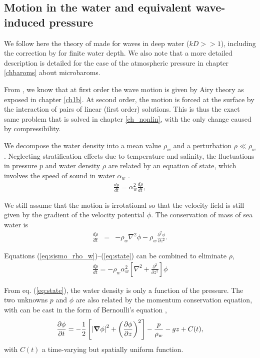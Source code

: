 \subsection{Motion in the water and equivalent wave-induced pressure}
We follow here the theory of \cite{Hasselmann1963c} made for waves in deep water ($kD >> 1$), including the correction by \cite{Ardhuin&Herbers2013} for  finite water depth. We also note that a more detailed description is detailed for the case of the atmospheric pressure in chapter \ref{chbaroms} about microbaroms. 

From \cite{Longuet-Higgins1950}, we know that at first order the wave motion is given by Airy theory as exposed in chapter \ref{ch1b}. 
At second order, the motion is forced at the surface by the interaction of pairs of linear (first order) solutions. This is thus the exact same problem that is solved in chapter \ref{ch_nonlin}, 
with the only change caused by compressibility. 

We decompose the water density into a mean value
$\rho_w$ and a perturbation $\rho \ll \rho_w$. 
Neglecting stratification effects due to temperature and salinity, 
the fluctuations in pressure $p$ and water density $\rho$ are related by an equation of state, 
which involves the speed of sound in water $\alpha_w$ \citep[][eq. 32]{Lighthill1978}.
\begin{eqnarray}
  \frac{d p}{d t}= \alpha_w^2 \frac{d \rho}{d t} \label{eq:state},
\end{eqnarray}

We still assume that the motion is irrotational so that the velocity field is still given by the gradient of 
the velocity potential $\phi$.  
The conservation of mass of sea water is 
\begin{eqnarray}
\frac{d \rho}{d t}&=& - \rho_w \nabla^2 \phi - \rho_w \frac{\partial^2 \phi}{\partial z^2}  \label{eq:sismo_rho_w}.
\end{eqnarray}


Equations (\ref{eq:sismo_rho_w})--(\ref{eq:state}) can be combined to eliminate $\rho$, 
\begin{eqnarray}
\frac{d p}{d t}=   -\rho_w \alpha_w^2 \left[ 
\nabla^2 + \frac{\partial^2 }{\partial z^2}\right] \phi \label{eq:sismo_p_w2a}
\end{eqnarray}

From eq. (\ref{eq:state}), the water density is only a function of the pressure. 
The two unknowns $p$ and $\phi$ are also related by the momentum conservation equation, 
with can be cast in the form of Bernoulli's equation 
 \citep[see e.g.][section 20]{Lamb1932},
\begin{equation}
    \frac{\partial \phi}{\partial t} = 
    -\frac{1}{2}\left[
    \left|\mbox{\boldmath $\nabla$} \phi\right|^2
    +\left(\frac{\partial \phi}{\partial z}\right)^2
    \right]-\frac{p}{\rho_w} - gz + C(t),
\label{Bernoulli2}
\end{equation}
with $C(t)$ a time-varying but spatially uniform function.

